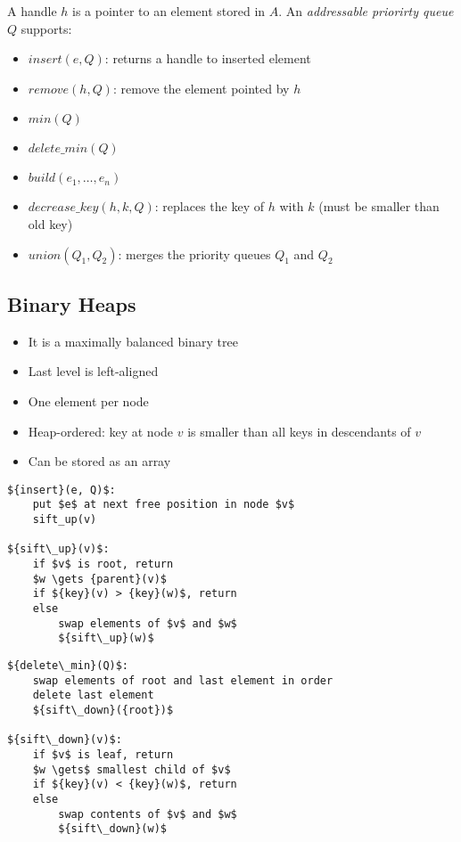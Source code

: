 A handle $h$ is a pointer to an element stored in $A$.
An \emph{addressable priorirty queue} $Q$ supports:
\begin{itemize}
\item ${insert}(e, Q)$: returns a handle to inserted element
\item ${remove}(h, Q)$: remove the element pointed by $h$
\item ${min}(Q)$
\item ${delete\_min}(Q)$
\item ${build}(e_1, \ldots, e_n)$
\item ${decrease\_key}(h, k, Q)$: replaces the key of $h$ with $k$ (must be smaller than old key)
\item ${union}(Q_1, Q_2)$: merges the priority queues $Q_1$ and $Q_2$
\end{itemize}

\subsection{Binary Heaps}

\begin{itemize}
\item It is a maximally balanced binary tree
\item Last level is left-aligned
\item One element per node
\item Heap-ordered: key at node $v$ is smaller than all keys in descendants of $v$
\item Can be stored as an array
\end{itemize}

\begin{lstlisting}[mathescape]
${insert}(e, Q)$:
    put $e$ at next free position in node $v$
    sift_up(v)
    
${sift\_up}(v)$:
    if $v$ is root, return
    $w \gets {parent}(v)$
    if ${key}(v) > {key}(w)$, return
    else
        swap elements of $v$ and $w$
        ${sift\_up}(w)$
\end{lstlisting}

\begin{lstlisting}[mathescape]
${delete\_min}(Q)$:
    swap elements of root and last element in order
    delete last element
    ${sift\_down}({root})$

${sift\_down}(v)$:
    if $v$ is leaf, return
    $w \gets$ smallest child of $v$
    if ${key}(v) < {key}(w)$, return
    else
        swap contents of $v$ and $w$
        ${sift\_down}(w)$
\end{lstlisting}

